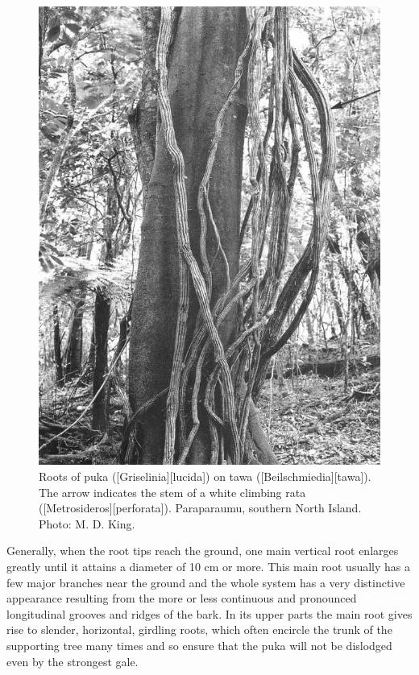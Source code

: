 \begin{figure}[htb]
\begin{minipage}[t]{0.494\textwidth}
    	\includegraphics[width=\textwidth]{graphics/figure47puka-roots.jpg}
    	\caption[Roots of puka on tawa]{Roots of puka ([Griselinia][lucida]) on tawa ([Beilschmiedia][tawa]).
    	The arrow indicates the stem of a white climbing rata ([Metrosideros][perforata]).
    	Paraparaumu, southern North Island.
    	Photo: M. D. King.}%
    	\label{fig:47puka-roots}
	\end{minipage}
\end{figure}

Generally, when the root tips reach the ground, one main vertical root enlarges greatly until it attains a diameter of 10 cm or more.
This main root usually has a few major branches near the ground and the whole system has a very distinctive appearance resulting from the more or less continuous and pronounced longitudinal grooves and ridges of the bark.
In its upper parts the main root gives rise to slender, horizontal, girdling roots, which often encircle the trunk of the supporting tree many times and so ensure that the puka will not be dislodged even by the strongest gale.

